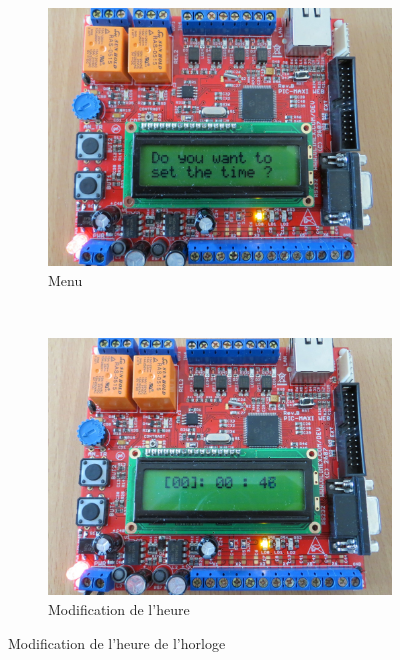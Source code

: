 \documentclass[12pt,a4paper]{article}
\begin{document}
\begin{figure}[!h]
        \centering
        \begin{subfigure}[b]{0.5\textwidth}
                \includegraphics[width=\textwidth]{photos/IMG_2150.JPG}
                \caption{Menu}
                \label{fig:questionhorloge}
        \end{subfigure}%
        ~ %
        \begin{subfigure}[b]{0.5\textwidth}
                \includegraphics[width=\textwidth]{photos/IMG_2153.JPG}
                \caption{Modification de l'heure}
                \label{fig:modificationhorloge}
        \end{subfigure}
        \caption{Modification de l'heure de l'horloge}\label{fig:horloge}
\end{figure}
\end{document}
